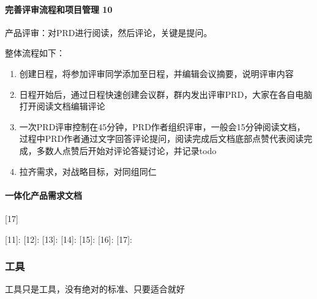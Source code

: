 \documentclass[letterpaper,11pt,english]{sphinxmanual}
\begin{document}
\paragraph{完善评审流程和项目管理 10\sphinxfootnotemark[500]}
\label{\detokenize{chapter_knowledge/PRD:id29}}%
\begin{footnotetext}[500]\sphinxAtStartFootnote
{}
%
\end{footnotetext}\ignorespaces 
产品评审：对PRD进行阅读，然后评论，关键是提问。

整体流程如下：
\begin{enumerate}
%
\item {} 
创建日程，将参加评审同学添加至日程，并编辑会议摘要，说明评审内容

\item {} 
日程开始后，通过日程快速创建会议群，群内发出评审PRD，大家在各自电脑打开阅读文档编辑评论

\item {} 
一次PRD评审控制在45分钟，PRD作者组织评审，一般会15分钟阅读文档，过程中PRD作者通过文字回答评论提问，阅读完成后文档底部点赞代表阅读完成，多数人点赞后开始对评论答疑讨论，并记录todo

\item {} 
拉齐需求，对战略目标，对同组同仁

\end{enumerate}


\paragraph{一体化产品需求文档}
\label{\detokenize{chapter_knowledge/PRD:id30}}
{[}17{]}

{[}11{]}: {[}12{]}:  {[}13{]}:
 {[}14{]}:
 {[}15{]}:
 {[}16{]}:
 {[}17{]}:


\subsubsection{工具}
\label{\detokenize{chapter_knowledge/tools:id1}}\label{\detokenize{chapter_knowledge/tools::doc}}
工具只是工具，没有绝对的标准、只要适合就好
\end{document}
